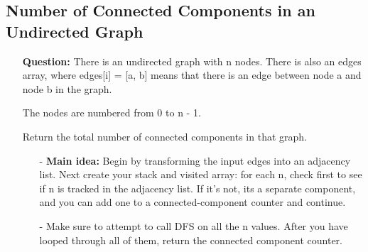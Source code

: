 \documentclass[12pt]{article}
\begin{document}
\subsection{Number of Connected Components in an Undirected Graph}
\begin{enumerate}
  \item[] \textbf{Question:} There is an undirected graph with n nodes. There is also an edges array, where edges[i] = [a, b] means that there is an edge between node a and node b in the graph.

The nodes are numbered from 0 to n - 1.

Return the total number of connected components in that graph.

    \begin{enumerate}
      \item[-] \textbf{Main idea:} Begin by transforming the input edges into an adjacency list. Next create your stack and visited array: for each n, check first to see if n is tracked in the adjacency list. If it's not, its a separate component, and you can add one to a connected-component counter and continue.
      \item[-] Make sure to attempt to call DFS on all the n values. After you have looped through all of them, return the connected component counter.
    \end{enumerate}
\end{enumerate}
\end{document}
